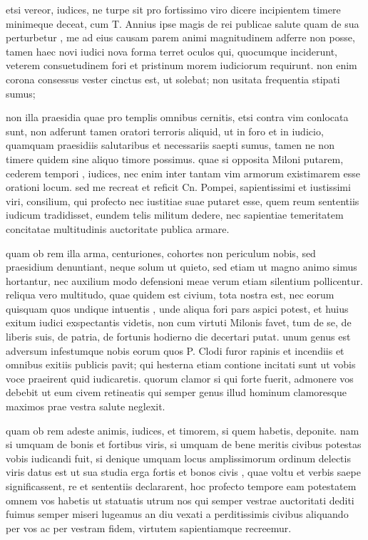 
 etsi vereor, iudices, ne turpe sit pro fortissimo viro dicere incipientem timere minimeque deceat, cum T. Annius ipse magis de rei publicae salute quam de sua perturbetur , me ad eius causam parem animi magnitudinem adferre non posse, tamen haec novi iudici nova forma terret oculos qui, quocumque inciderunt, veterem consuetudinem fori et pristinum morem iudiciorum requirunt. non enim corona consessus vester cinctus est, ut solebat; non usitata frequentia stipati sumus;

 non illa praesidia quae pro templis omnibus cernitis, etsi contra vim conlocata sunt, non adferunt tamen oratori terroris aliquid, ut in foro et in iudicio, quamquam praesidiis salutaribus et necessariis saepti sumus, tamen ne non timere quidem sine aliquo timore possimus. quae si opposita Miloni putarem, cederem tempori , iudices, nec enim inter tantam vim armorum existimarem esse orationi locum. sed me recreat et reficit Cn. Pompei, sapientissimi et iustissimi viri, consilium, qui profecto nec iustitiae suae putaret esse, quem reum sententiis iudicum tradidisset, eundem telis militum dedere, nec sapientiae temeritatem concitatae multitudinis auctoritate publica armare.

 quam ob rem illa arma, centuriones, cohortes non periculum nobis, sed praesidium denuntiant, neque solum ut quieto, sed etiam ut magno animo simus hortantur, nec auxilium modo defensioni meae verum etiam silentium pollicentur. reliqua vero multitudo, quae quidem est civium, tota nostra est, nec eorum quisquam quos undique intuentis , unde aliqua fori pars aspici potest, et huius exitum iudici exspectantis videtis, non cum virtuti Milonis favet, tum de se, de liberis suis, de patria, de fortunis hodierno die decertari putat. unum genus est adversum infestumque nobis eorum quos P. Clodi furor rapinis et incendiis et omnibus exitiis publicis pavit; qui hesterna etiam contione incitati sunt ut vobis voce praeirent quid iudicaretis. quorum clamor si qui forte fuerit, admonere vos debebit ut eum civem retineatis qui semper genus illud hominum clamoresque maximos prae vestra salute neglexit.

 quam ob rem adeste animis, iudices, et timorem, si quem habetis, deponite. nam si umquam de bonis et fortibus viris, si umquam de bene meritis civibus potestas vobis iudicandi fuit, si denique umquam locus amplissimorum ordinum delectis viris datus est ut sua studia erga fortis et bonos civis , quae voltu et verbis saepe significassent, re et sententiis declararent, hoc profecto tempore eam potestatem omnem vos habetis ut statuatis utrum nos qui semper vestrae auctoritati dediti fuimus semper miseri lugeamus an diu vexati a perditissimis civibus aliquando per vos ac per vestram fidem, virtutem sapientiamque recreemur.

